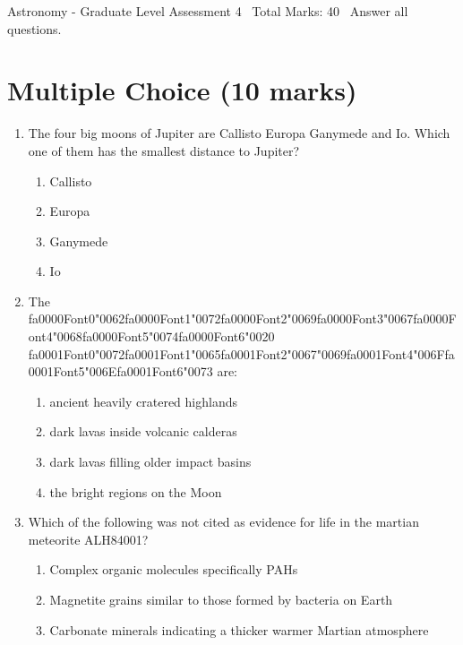 \documentclass[12pt]{article}
\begin{document}
\begin{center}
Astronomy - Graduate Level Assessment 4 \
Total Marks: 40 \
Answer all questions.
\end{center}

\section*{Multiple Choice (10 marks)}
\begin{enumerate}[label=\arabic*.]
\item The four big moons of Jupiter are Callisto Europa Ganymede and Io. Which one of them has
the smallest distance to Jupiter?
\begin{enumerate}[label=(\alph*)]
    \item Callisto
    \item Europa
    \item Ganymede
    \item Io
\end{enumerate}
\item The {\csname fa0000Font0\endcsname\char"0062}{\csname fa0000Font1\endcsname\char"0072}{\csname fa0000Font2\endcsname\char"0069}{\csname fa0000Font3\endcsname\char"0067}{\csname fa0000Font4\endcsname\char"0068}{\csname fa0000Font5\endcsname\char"0074}{\csname fa0000Font6\endcsname\char"0020} {\csname fa0001Font0\endcsname\char"0072}{\csname fa0001Font1\endcsname\char"0065}{\csname fa0001Font2\endcsname\char"0067}{\char"0069}{\csname fa0001Font4\endcsname\char"006F}{\csname fa0001Font5\endcsname\char"006E}{\csname fa0001Font6\endcsname\char"0073} are:
\begin{enumerate}[label=(\alph*)]
    \item ancient heavily cratered highlands
    \item dark lavas inside volcanic calderas
    \item dark lavas filling older impact basins
    \item the bright regions on the Moon
\end{enumerate}
\item Which of the following was not cited as evidence for life in the martian meteorite
ALH84001?
\begin{enumerate}[label=(\alph*)]
    \item Complex organic molecules specifically PAHs
    \item Magnetite grains similar to those formed by bacteria on Earth
    \item Carbonate minerals indicating a thicker warmer Martian atmosphere

\end{enumerate}
\end{enumerate}
\end{document}
